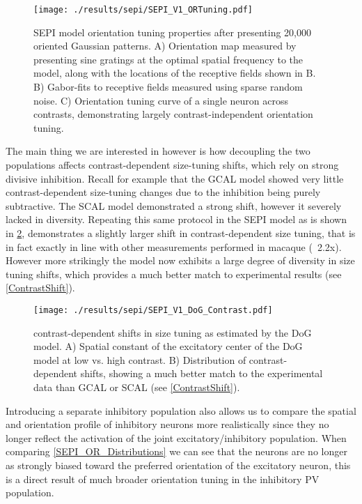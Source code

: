 \begin{figure}
	\centering
    \texttt{[image: ./results/sepi/SEPI\_V1\_ORTuning.pdf]}
	\caption{SEPI model orientation tuning properties after presenting
      20,000 oriented Gaussian patterns. A) Orientation map measured
      by presenting sine gratings at the optimal spatial frequency to
      the model, along with the locations of the receptive fields
      shown in B. B) Gabor-fits to receptive fields measured using
      sparse random noise. C) Orientation tuning curve of a single
      neuron across contrasts, demonstrating largely
      contrast-independent orientation tuning.}
	\label{SEPIORTuning}
\end{figure}

The main thing we are interested in however is how decoupling the two
populations affects contrast-dependent size-tuning shifts, which rely
on strong divisive inhibition. Recall for example that the GCAL model
showed very little contrast-dependent size-tuning changes due to the
inhibition being purely subtractive. The SCAL model demonstrated a
strong shift, however it severely lacked in diversity. Repeating this
same protocol in the SEPI model as is shown in
\ref{SEPI_DoG_Contrast}, demonstrates a slightly larger shift in
contrast-dependent size tuning, that is in fact exactly in line with
other measurements performed in macaque (~2.2x). However more
strikingly the model now exhibits a large degree of diversity in size
tuning shifts, which provides a much better match to experimental
results (see \ref{ContrastShift}).

\begin{figure}
	\centering
        \texttt{[image: ./results/sepi/SEPI\_V1\_DoG\_Contrast.pdf]}
	\caption{contrast-dependent shifts in size tuning as estimated by
      the DoG model. A) Spatial constant of the excitatory center of
      the DoG model at low vs. high contrast. B) Distribution of
      contrast-dependent shifts, showing a much better match to the
      experimental data than GCAL or SCAL (see \ref{ContrastShift}).}
	\label{SEPI_DoG_Contrast}
\end{figure}

Introducing a separate inhibitory population also allows us to compare
the spatial and orientation profile of inhibitory neurons more
realistically since they no longer reflect the activation of the joint
excitatory/inhibitory population. When comparing
\ref{SEPI_OR_Distributions} we can see that the neurons are no longer
as strongly biased toward the preferred orientation of the excitatory
neuron, this is a direct result of much broader orientation tuning in
the inhibitory PV population.

